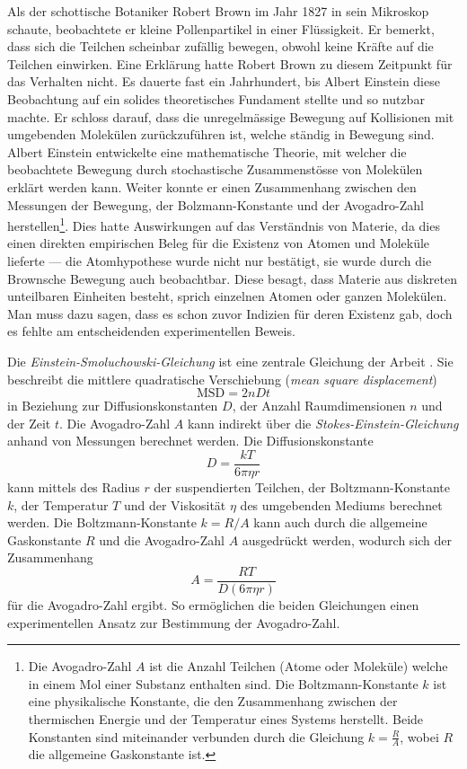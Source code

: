 Als der schottische Botaniker Robert Brown im Jahr 1827 in sein Mikroskop schaute, beobachtete er kleine Pollenpartikel in einer Flüssigkeit. Er bemerkt, dass sich die Teilchen scheinbar zufällig bewegen, obwohl keine Kräfte auf die Teilchen einwirken. Eine Erklärung hatte Robert Brown zu diesem Zeitpunkt für das Verhalten nicht. Es dauerte fast ein Jahrhundert, bis Albert Einstein diese Beobachtung auf ein solides theoretisches Fundament stellte und so nutzbar machte. Er schloss darauf, dass die unregelmässige Bewegung auf Kollisionen mit umgebenden Molekülen zurückzuführen ist, welche ständig in Bewegung sind. Albert Einstein entwickelte eine mathematische Theorie, mit welcher die beobachtete Bewegung durch stochastische Zusammenstösse von Molekülen erklärt werden kann. Weiter konnte er einen Zusammenhang zwischen den Messungen der Bewegung, der Bolzmann-Konstante und der  Avogadro-Zahl herstellen\footnote{Die Avogadro-Zahl $ A $ ist die Anzahl Teilchen (Atome oder Moleküle) welche in einem Mol einer Substanz enthalten sind. Die Boltzmann-Konstante $ k $ ist eine physikalische Konstante, die den Zusammenhang zwischen der thermischen Energie und der Temperatur eines Systems herstellt. Beide Konstanten sind miteinander verbunden durch die Gleichung $ k = \frac{R}{A} $, wobei $ R $ die allgemeine Gaskonstante ist.}. Dies hatte Auswirkungen auf das Verständnis von Materie, da dies einen direkten empirischen Beleg für die Existenz von Atomen und Moleküle lieferte --- die Atomhypothese wurde nicht nur bestätigt, sie wurde durch die Brownsche Bewegung auch beobachtbar. Diese besagt, dass Materie aus diskreten unteilbaren Einheiten besteht, sprich einzelnen Atomen oder ganzen Molekülen. Man muss dazu sagen, dass es schon zuvor Indizien für deren Existenz gab, doch es fehlte am entscheidenden experimentellen Beweis.


Die \textit{Einstein-Smoluchowski-Gleichung} ist eine zentrale Gleichung der Arbeit \cite{einstein1922untersuchungen}. Sie beschreibt die mittlere quadratische Verschiebung (\textit{mean square displacement})
\begin{equation}
	\mathrm{MSD} = 2nDt
\end{equation}
in Beziehung zur Diffusionskonstanten $ D $, der Anzahl Raumdimensionen $ n $ und der Zeit $ t $. Die Avogadro-Zahl $ A $ kann indirekt über die \textit{Stokes-Einstein-Gleichung} anhand von Messungen berechnet werden. Die Diffusionskonstante
\begin{equation}
	D = \frac{kT}{6\pi\eta r}
\end{equation}
kann mittels des Radius $ r $ der suspendierten Teilchen, der Boltzmann-Konstante  $ k $, der Temperatur $ T $ und der Viskosität $ \eta $ des umgebenden Mediums berechnet werden. Die Boltzmann-Konstante  $ k = R/A $ kann auch durch die allgemeine Gaskonstante $ R $ und die Avogadro-Zahl $ A $ ausgedrückt werden, wodurch sich der Zusammenhang
\begin{equation}
	A = \frac{R T}{D (6 \pi \eta r)}
\end{equation}
für die Avogadro-Zahl ergibt. So ermöglichen die beiden Gleichungen einen experimentellen Ansatz zur Bestimmung der Avogadro-Zahl.

